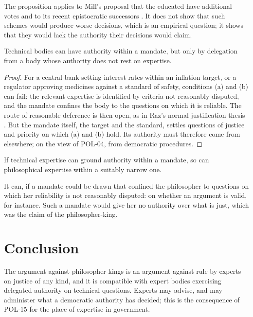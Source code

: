 \documentclass{situationist-preprint}
\begin{document}
The proposition applies to Mill's proposal that the educated have additional votes \citep[ch.~8]{Mill1861} and to its recent epistocratic successors \citep{Brennan2016}. It does not show that such schemes would produce worse decisions, which is an empirical question; it shows that they would lack the authority their decisions would claim.

\begin{proposition}\label{p:delegation}
Technical bodies can have authority within a mandate, but only by delegation from a body whose authority does not rest on expertise.
\end{proposition}

\begin{proof}
For a central bank setting interest rates within an inflation target, or a regulator approving medicines against a standard of safety, conditions (a) and (b) can fail: the relevant expertise is identified by criteria not reasonably disputed, and the mandate confines the body to the questions on which it is reliable. The route of reasonable deference is then open, as in Raz's normal justification thesis \citep{Raz1986}. But the mandate itself, the target and the standard, settles questions of justice and priority on which (a) and (b) hold. Its authority must therefore come from elsewhere; on the view of POL-04, from democratic procedures.
\end{proof}

\begin{objection}
If technical expertise can ground authority within a mandate, so can philosophical expertise within a suitably narrow one.
\end{objection}

\begin{reply}
It can, if a mandate could be drawn that confined the philosopher to questions on which her reliability is not reasonably disputed: on whether an argument is valid, for instance. Such a mandate would give her no authority over what is just, which was the claim of the philosopher-king.
\end{reply}

\section{Conclusion}

The argument against philosopher-kings is an argument against rule by experts on justice of any kind, and it is compatible with expert bodies exercising delegated authority on technical questions. Experts may advise, and may administer what a democratic authority has decided; this is the consequence of POL-15 for the place of expertise in government.
\end{document}
